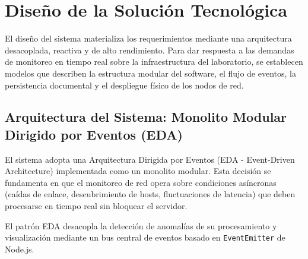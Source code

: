 \documentclass[12pt,a4paper]{report}
\begin{document}
\section{Diseño de la Solución Tecnológica}

El diseño del sistema materializa los requerimientos mediante una arquitectura desacoplada, reactiva y de alto rendimiento. Para dar respuesta a las demandas de monitoreo en tiempo real sobre la infraestructura del laboratorio, se establecen modelos que describen la estructura modular del software, el flujo de eventos, la persistencia documental y el despliegue físico de los nodos de red.

\subsection{Arquitectura del Sistema: Monolito Modular Dirigido por Eventos (EDA)}

El sistema adopta una Arquitectura Dirigida por Eventos (EDA - Event-Driven Architecture) implementada como un monolito modular. Esta decisión se fundamenta en que el monitoreo de red opera sobre condiciones asíncronas (caídas de enlace, descubrimiento de hosts, fluctuaciones de latencia) que deben procesarse en tiempo real sin bloquear el servidor.

El patrón EDA desacopla la detección de anomalías de su procesamiento y visualización mediante un bus central de eventos basado en \texttt{EventEmitter} de Node.js.
\end{document}
